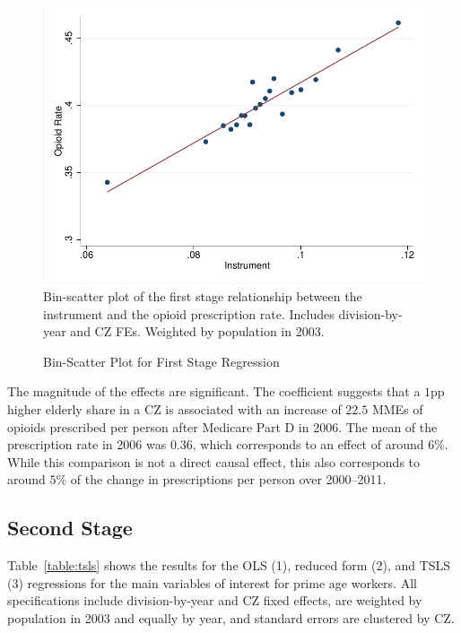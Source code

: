 \documentclass[12pt]{article}
\begin{document}
\begin{figure}[htbp]
    \centering
    \caption{Bin-Scatter Plot for First Stage Regression}
    \begin{minipage}{0.8\textwidth}
    \includegraphics[width=\textwidth]{figs/graph_binscatter.pdf}
    \footnotesize
    Bin-scatter plot of the first stage relationship between the instrument and the opioid prescription rate.  Includes division-by-year and CZ FEs. Weighted by population in 2003.
    \end{minipage}
    \label{figure:binscatter}
\end{figure}

The magnitude of the effects are significant.  The coefficient suggests that a $1$pp higher elderly share in a CZ is associated with an increase of $22.5$ MMEs of opioids prescribed per person after Medicare Part D in 2006.  The mean of the prescription rate in 2006 was $0.36$, which corresponds to an effect of around $6\%$.  While this comparison is not a direct causal effect, this also corresponds to around $5\%$ of the change in prescriptions per person over 2000--2011.

\subsection{Second Stage}
Table~\ref{table:tsls} shows the results for the OLS (1), reduced form (2), and TSLS (3) regressions for the main variables of interest for prime age workers.  All specifications include division-by-year and CZ fixed effects, are weighted by population in 2003 and equally by year, and standard errors are clustered by CZ\@.
\end{document}
